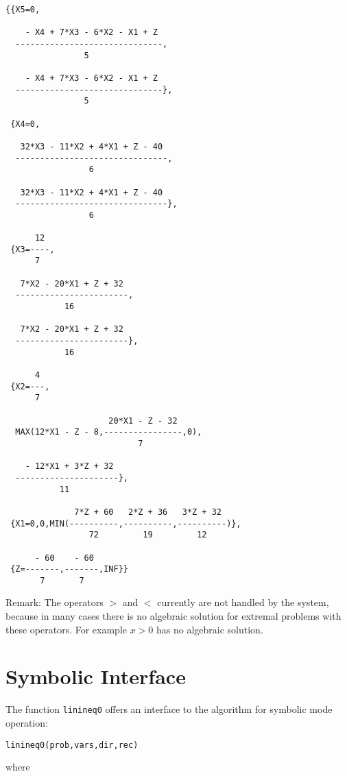 \begin{verbatim}
{{X5=0,

    - X4 + 7*X3 - 6*X2 - X1 + Z
  ------------------------------,
                5

    - X4 + 7*X3 - 6*X2 - X1 + Z
  ------------------------------},
                5

 {X4=0,

   32*X3 - 11*X2 + 4*X1 + Z - 40
  -------------------------------,
                 6

   32*X3 - 11*X2 + 4*X1 + Z - 40
  -------------------------------},
                 6

      12
 {X3=----,
      7

   7*X2 - 20*X1 + Z + 32
  -----------------------,
            16

   7*X2 - 20*X1 + Z + 32
  -----------------------},
            16

      4
 {X2=---,
      7

                     20*X1 - Z - 32
  MAX(12*X1 - Z - 8,----------------,0),
                           7

    - 12*X1 + 3*Z + 32
  ---------------------},
           11

              7*Z + 60   2*Z + 36   3*Z + 32
 {X1=0,0,MIN(----------,----------,----------)},
                 72         19         12

      - 60    - 60
 {Z=-------,-------,INF}}
       7       7
\end{verbatim}

Remark:  The operators $>$ and $<$ currently are not handled by the
system, because in many cases there is no algebraic solution for extremal
problems with these operators. For example ${x>0}$ has no algebraic solution.



\section{Symbolic Interface}

The function {\tt linineq0} offers an interface to the algorithm for symbolic
mode operation:

\begin{center} {\tt linineq0(prob,vars,dir,rec)} \end{center}

where

